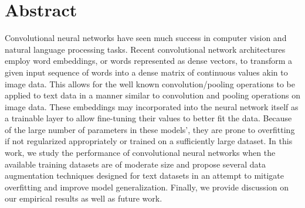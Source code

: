 

\chapter*{Abstract}
Convolutional neural networks have seen much success in computer vision and natural language processing tasks.
Recent convolutional network architectures employ word embeddings, or words represented as dense vectors, to
transform a given input sequence of words into a dense matrix of continuous values akin to image data.
This allows for the well known convolution/pooling operations to be applied to text data in a manner similar to
convolution and pooling operations on image data. These embeddings may incorporated into the neural
network itself as a trainable layer to allow fine-tuning their values to better fit the data.
Because of the large number of parameters in these models', they are prone to overfitting
if not regularized appropriately or trained on a sufficiently large dataset.
In this work, we study the performance of convolutional neural networks when the available training datasets
are of moderate size and propose several data augmentation techniques designed for text datasets in an attempt
to mitigate overfitting and improve model generalization.
Finally, we provide discussion on our empirical results as well as future work.
